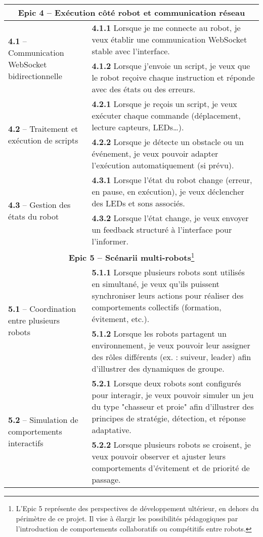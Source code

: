 \begin{longtable}{|p{}|p{}|}
\multicolumn{2}{|c|}{\textbf{Epic 4 – Exécution côté robot et communication réseau}} \\
\hline
\multirow{2}{=}{\textbf{4.1 } – Communication WebSocket bidirectionnelle} & \textbf{4.1.1}  Lorsque je me connecte au robot, je veux établir une communication WebSocket stable avec l’interface. \\
 & \textbf{4.1.2}  Lorsque j’envoie un script, je veux que le robot reçoive chaque instruction et réponde avec des états ou des erreurs. \\
\hline
\multirow{2}{=}{\textbf{4.2 } – Traitement et exécution de scripts} & \textbf{4.2.1}  Lorsque je reçois un script, je veux exécuter chaque commande (déplacement, lecture capteurs, LEDs…). \\
 & \textbf{4.2.2}  Lorsque je détecte un obstacle ou un événement, je veux pouvoir adapter l’exécution automatiquement (si prévu). \\
\hline
\multirow{2}{=}{\textbf{4.3 } – Gestion des états du robot} & \textbf{4.3.1}  Lorsque l’état du robot change (erreur, en pause, en exécution), je veux déclencher des LEDs et sons associés. \\
 & \textbf{4.3.2}  Lorsque l’état change, je veux envoyer un feedback structuré à l’interface pour l’informer. \\
\hline

\multicolumn{2}{|c|}{\textbf{Epic 5 – Scénarii multi-robots}\footnote{L'Epic 5 représente des perspectives de développement ultérieur, en dehors du périmètre de ce projet.
Il vise à élargir les possibilités pédagogiques par l'introduction de comportements collaboratifs ou compétitifs entre robots.}} \\
\hline
\multirow{2}{=}{\textbf{5.1 } – Coordination entre plusieurs robots} & \textbf{5.1.1}  Lorsque plusieurs robots sont utilisés en simultané, je veux qu’ils puissent synchroniser leurs actions pour réaliser des comportements collectifs (formation, évitement, etc.). \\
 & \textbf{5.1.2}  Lorsque les robots partagent un environnement, je veux pouvoir leur assigner des rôles différents (ex. : suiveur, leader) afin d’illustrer des dynamiques de groupe. \\
\hline
\multirow{2}{=}{\textbf{5.2 } – Simulation de comportements interactifs} & \textbf{5.2.1}  Lorsque deux robots sont configurés pour interagir, je veux pouvoir simuler un jeu du type "chasseur et proie" afin d’illustrer des principes de stratégie, détection, et réponse adaptative. \\
 & \textbf{5.2.2}  Lorsque plusieurs robots se croisent, je veux pouvoir observer et ajuster leurs comportements d’évitement et de priorité de passage. \\
\hline

\end{longtable}

